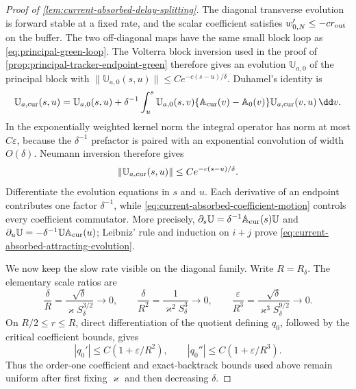 \begin{proof}[Proof of
\cref{lem:current-absorbed-delay-splitting}]
The diagonal transverse evolution is forward stable at a fixed rate, and
the scalar coefficient satisfies \(w_{0,N}'\le-c r_{\rm out}\) on the
buffer.  The two off-diagonal maps have the same small block loop as
\cref{eq:principal-green-loop}.  The Volterra block inversion used in
the proof of \cref{prop:principal-tracker-endpoint-green} therefore gives
an evolution \(\mathbb U_{a,0}\) of the principal block with
\(\|\mathbb U_{a,0}(s,u)\|\le Ce^{-c(s-u)/\delta}\).  Duhamel's identity is
\begin{equation*}
 \mathbb U_{a,\rm cur}(s,u)=\mathbb U_{a,0}(s,u)
 +\delta^{-1}\int_u^s\mathbb U_{a,0}(s,v)
       \{\mathbb A_{\rm cur}(v)-\mathbb A_0(v)\}
       \mathbb U_{a,\rm cur}(v,u)\,\dd v.
\end{equation*}
In the exponentially weighted kernel norm the integral operator has norm
at most \(C\varepsilon\), because the \(\delta^{-1}\) prefactor is paired
with an exponential convolution of width \(O(\delta)\).  Neumann inversion
therefore gives
\[
 \|\mathbb U_{a,\rm cur}(s,u)\|
 \le Ce^{-c(s-u)/\delta}.
\]
Differentiate the evolution equations in \(s\) and \(u\).  Each derivative
of an endpoint contributes one factor \(\delta^{-1}\), while
\cref{eq:current-absorbed-coefficient-motion} controls every coefficient
commutator.  More precisely,
\(\partial_s\mathbb U=\delta^{-1}\mathbb A_{\rm cur}(s)\mathbb U\) and
\(\partial_u\mathbb U=-\delta^{-1}\mathbb U\mathbb A_{\rm cur}(u)\);
Leibniz' rule and induction on \(i+j\) prove
\cref{eq:current-absorbed-attracting-evolution}.

We now keep the slow rate visible on the diagonal family.  Write
\(R=R_\delta\).  The elementary scale ratios are
\begin{equation}
 \frac{\delta}{R}
 =\frac{\sqrt\delta}{\varkappa S_\delta^{3/2}}\longrightarrow0,
 \qquad
 \frac{\delta}{R^2}
 =\frac1{\varkappa^2S_\delta^3}\longrightarrow0,
 \qquad
 \frac{\varepsilon}{R^3}
 =\frac{\sqrt\delta}{\varkappa^3S_\delta^{9/2}}
 \longrightarrow0.                              \label{eq:proof-diagonal-buffer-ratios}
\end{equation}
On \(R/2\le r\le R\), direct differentiation of the quotient defining
\(q_0\), followed by the critical coefficient bounds, gives
\[
 |q_0'|\le C(1+\varepsilon/R^2),\qquad
 |q_0''|\le C(1+\varepsilon/R^3).
\]
Thus the order-one coefficient and exact-backtrack bounds used above
remain uniform after first fixing \(\varkappa\) and then decreasing
\(\delta\).


\end{proof}
